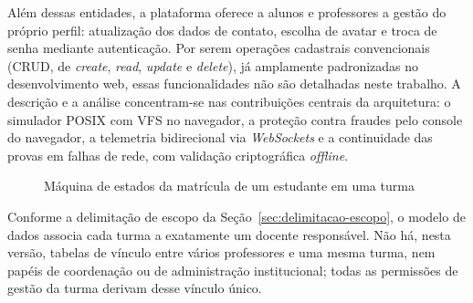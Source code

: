 Além dessas entidades, a plataforma oferece a alunos e professores a gestão do próprio perfil: atualização dos dados de contato, escolha de avatar e troca de senha mediante autenticação. Por serem operações cadastrais convencionais (CRUD, de \textit{create}, \textit{read}, \textit{update} e \textit{delete}), já amplamente padronizadas no desenvolvimento web, essas funcionalidades não são detalhadas neste trabalho. A descrição e a análise concentram-se nas contribuições centrais da arquitetura: o simulador POSIX com VFS no navegador, a proteção contra fraudes pelo console do navegador, a telemetria bidirecional via \textit{WebSockets} e a continuidade das provas em falhas de rede, com validação criptográfica \textit{offline}.

\begin{figure}[htbp]
    \centering
    \caption{Máquina de estados da matrícula de um estudante em uma turma}
    \label{fig:estados-matricula}
\end{figure}

Conforme a delimitação de escopo da Seção~\ref{sec:delimitacao-escopo}, o modelo de dados associa cada turma a exatamente um docente responsável. Não há, nesta versão, tabelas de vínculo entre vários professores e uma mesma turma, nem papéis de coordenação ou de administração institucional; todas as permissões de gestão da turma derivam desse vínculo único.

